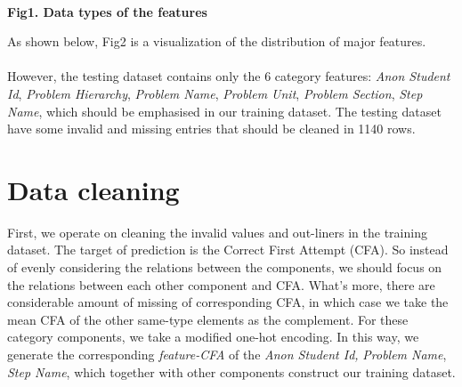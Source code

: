 \documentclass{article}
\begin{document}
\begin{center} 
\centering
{}\\
\textbf{Fig1. Data types of the features}\\
\end{center}
As shown below, Fig2 is a visualization of the distribution of major features.\\\\
However, the testing dataset contains only the 6 category features: \textit{Anon Student Id}, \textit{Problem Hierarchy}, \textit{Problem Name}, \textit{Problem Unit}, \textit{Problem Section}, \textit{Step Name}, which should be emphasised in our training dataset. The testing dataset have some invalid and  missing entries that should be cleaned in 1140 rows.\\

\section{Data cleaning}
First, we operate on cleaning the invalid values and out-liners in the training dataset. The target of prediction is the Correct First Attempt (CFA). So instead of evenly considering the relations between the components, we should focus on the relations between each other component and CFA. What's more, there are considerable amount of missing of corresponding CFA, in which case we take the mean CFA of the other same-type elements as the complement. For these category components, we take a modified one-hot encoding. In this way, we generate the corresponding \textit{feature-CFA} of the \textit{Anon Student Id,} \textit{Problem Name}, \textit{Step Name}, which together with other components construct our training dataset.\\
\end{document}
